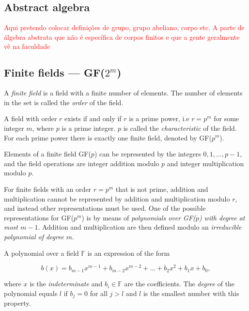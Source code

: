\subsection{Abstract algebra}
\textcolor{red}{Aqui pretendo colocar definições de grupo, grupo abeliano, corpo etc. A parte de álgebra abstrata que não é específica de corpos finitos e que a gente geralmente vê na faculdade}

\subsection{Finite fields --- GF($2^m$)}

\begin{concept}
A \emph{finite field} is a field with a finite number of elements. The number of elements in the set is called the \emph{order} of the field.
\end{concept}

\begin{concept}
A field with order $r$ exists if and only if $r$ is a prime power, i.e $r = p^m$ for some integer $m$, where $p$ is a prime integer. $p$ is called the \emph{characteristic} of the field. For each prime power there is exactly one finite field, denoted by GF($p^m$).
\end{concept}

\begin{concept}
Elements of a finite field GF($p$) can be represented by the integers $0, 1, ..., p - 1$, and the field operations are integer addition modulo $p$ and integer multiplication modulo $p$.
\end{concept}

\begin{concept}
For finite fields with an order $r = p^m$ that is not prime, addition and multiplication cannot be represented by addition and multiplication modulo $r$, and instead other representations must be used. One of the possible representations for GF($p^m$) is by means of \emph{polynomials over GF($p$) with degree at most $m-1$}. Addition and multiplication are then defined modulo an \emph{irreducible polynomial of degree $m$}.
\end{concept}

\begin{concept}
A polynomial over a field $\mathbb{F}$ is an expression of the form

$$
b(x) = b_{m-1}x^{m-1} + b_{m-2}x^{m-2} + ... + b_2x^2 + b_1x + b_0,
$$

where $x$ is the \emph{indeterminate} and $b_i \in \mathbb{F}$ are the coefficients. The \emph{degree} of the polynomial equals $l$ if $b_j = 0$ for all $j > l$ and $l$ is the smallest number with this property.
\end{concept}

